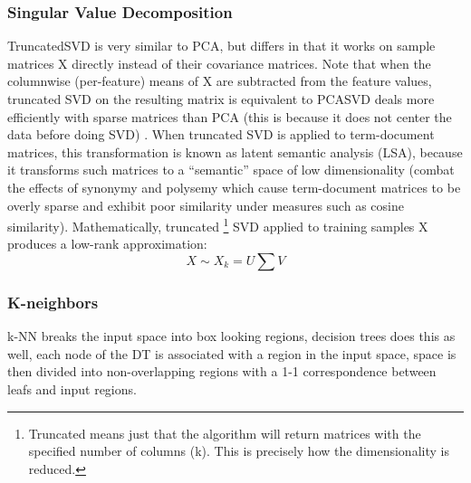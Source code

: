 \documentclass[11pt]{article}
\begin{document}
\subsubsection{Singular Value Decomposition}
TruncatedSVD is very similar to PCA, but differs in that it works on sample matrices X directly instead of their covariance matrices. Note that when the columnwise (per-feature) means of X are subtracted from the feature values, truncated SVD on the resulting matrix is equivalent to PCASVD deals more efficiently with sparse matrices than PCA (this is because it does not center the data before doing SVD) \cite{halko2009finding}. When truncated SVD is applied to term-document matrices, this transformation is known as latent semantic analysis (LSA), because it transforms such matrices to a “semantic” space of low dimensionality (combat the effects of synonymy and polysemy which cause term-document matrices to be overly sparse and exhibit poor similarity under measures such as cosine similarity).
Mathematically, truncated \footnote{Truncated means just that the algorithm will return matrices with the specified number of columns (k). This is precisely how the dimensionality is reduced.} SVD applied to training samples X produces a low-rank approximation:
\begin{equation}
X \sim X_k = U \sum V
\end{equation}

\subsubsection{K-neighbors}
k-NN breaks the input space into box looking regions, decision trees does this as well, each node of the DT is associated with a region in the input space, space is then divided into non-overlapping regions with a 1-1 correspondence between leafs and input regions.
\end{document}
